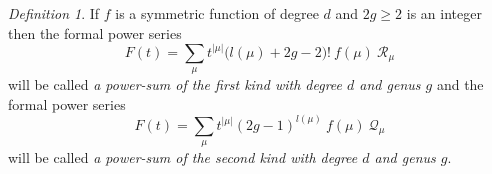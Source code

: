 \documentclass[12pt]{amsart}
\theoremstyle{plain}
\theoremstyle{remark}
\newtheorem{definition}[lemma]{Definition}
\begin{document}
\begin{definition}
If $f$ is a symmetric function of degree $d$ and $2g\geq 2$ is an integer then
the formal power series
\begin{equation}
\label{eq:postac-F-nice}
F(t)=  \sum_{\mu}  t^{|\mu|}
\big(l(\mu) + 2g - 2\big)!\ f(\mu)\ \mathcal{R}_\mu
\end{equation}
will be called \emph{a power-sum of the
first kind with degree $d$ and genus $g$}
and the formal power series
\begin{equation}
\label{eq:postac-F-vnice}
F(t)=  \sum_{\mu}  t^{|\mu|}(2g-1)^{l(\mu)}\ f(\mu)\ \mathcal{Q}_\mu
\end{equation}
will be called \emph{a power-sum of the second kind with degree $d$ and genus
$g$}.
\end{definition}
\end{document}
